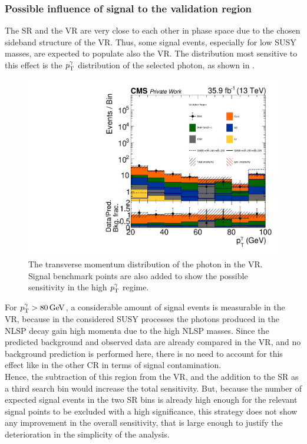 \subsubsection*{Possible influence of signal to the validation region}
The SR and the VR are very close to each other in phase space due to the chosen sideband structure of the VR. Thus, some signal events, especially for low SUSY masses, are expected to populate also the VR. The distribution most sensitive to this effect is the $p_{\mathrm{T}}^{\gamma}$ distribution of the selected photon, as shown in .
\begin{figure}[tbp]
 \centering
 \includegraphics[width=\pairwidth]{figures/VR_signal_study/VR_LL_pt_g1_log}
 \caption{The transverse momentum distribution of the photon in the VR. Signal benchmark points are also added to show the possible sensitivity in the high $p_{\mathrm{T}}^{\gamma}$ regime.}
 \label{fig:signalContVR}
\end{figure}
For $p_{\mathrm{T}}^{\gamma} >80\,\text{Ge\hspace{-.08em}V}$, a considerable amount of signal events is measurable in the VR, because in the considered SUSY processes the photons produced in the NLSP decay gain high momenta due to the high NLSP masses. Since the predicted background and observed data are already compared in the VR, and no background prediction is performed here, there is no need to account for this effect like in the other CR in terms of signal contamination.\\
Hence, the subtraction of this region from the VR, and the addition to the SR as a third search bin would increase the total sensitivity. But, because the number of expected signal events in the two SR bins is already high enough for the relevant signal points to be excluded with a high significance, this strategy does not show any improvement in the overall sensitivity, that is large enough to justify the deterioration in the simplicity of the analysis.

